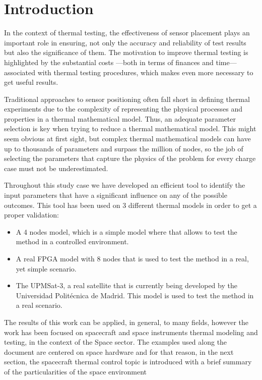 \chapter{Introduction} \label{ch:chapter01}
In the context of thermal testing, the effectiveness of sensor placement plays an important role in ensuring, not only the accuracy and reliability of test results but also the significance of them. The motivation to improve thermal testing is highlighted by the substantial costs —both in terms of finances and time— associated with thermal testing procedures, which makes even more necessary to get useful results.

Traditional approaches to sensor positioning often fall short in defining thermal experiments due to the complexity of representing the physical processes and properties in a thermal mathematical model. Thus, an adequate parameter selection is key when trying to reduce a thermal mathematical model. This might seem obvious at first sight, but  complex thermal mathematical models can have up to thousands of parameters and surpass the million of nodes, so the job of selecting the parameters that capture the physics of the problem for every charge case must not be underestimated.

Throughout this study case we have developed an efficient tool to identify the input parameters that have a significant influence on any of the possible outcomes. This tool has been used on 3 different thermal models in order to get a proper validation:

\begin{itemize}
	\item A 4 nodes model, which is a simple model where  that allows to test the method in a controlled environment.
	\item A real FPGA model with 8 nodes that is used to test the method in a real, yet simple scenario.
	\item The UPMSat-3, a real satellite that is currently being developed by the Universidad Politécnica de Madrid. This model is used to test the method in a real scenario.

\end{itemize}

The results of this work can be applied, in general, to many fields, however the work has been focused on spacecraft and space instruments thermal modeling and testing, in the context of
the Space sector. The examples used along the document are centered on space hardware and for that reason, in the next section, the spacecraft thermal control topic is introduced
with a brief summary of the particularities of the space environment

